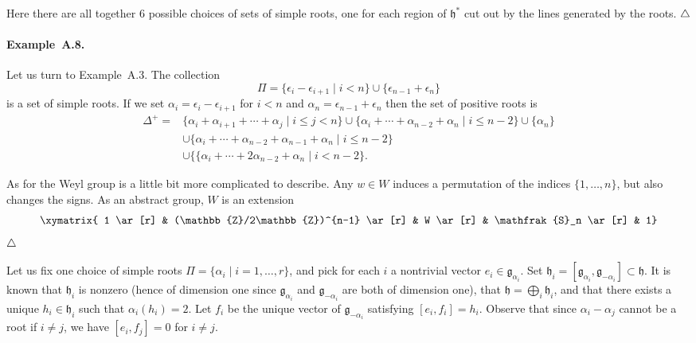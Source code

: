 \documentclass[a4paper,10pt]{amsart}
\def\Z{\mathbb{Z}}
\def\endexample{$\hfill \triangle$}
\def\a{\alpha}
\def\g{\mathfrak{g}}
\def\h{\mathfrak{h}}
\numberwithin{equation}{section}
\begin{document}
{\vspace{.9in}

\noindent Here there are all together $6$ possible choices of sets of simple roots, one for each region of $\h^*$ cut out by the lines generated by the roots.
\endexample

\vspace{.15in}

\addtocounter{theo}{1}

\paragraph{\textbf{Example~A.8.}} Let us turn to Example~A.3. The collection
$$\Pi=\{\epsilon_i-\epsilon_{i+1}\;|\; i <n\} \cup \{\epsilon_{n-1} + \epsilon_n\}$$
is a set of simple roots. If we set $\a_i=\epsilon_i-\epsilon_{i+1}$ for $i <n$ and $\alpha_n=\epsilon_{n-1} + \epsilon_n$ then the set of positive roots is
\begin{equation*}
\begin{split}
\Delta^+=& \{\a_i + \a_{i+1} + \cdots + \a_j\;|\; i\leq j<n\} \cup \{\a_i + \cdots + \a_{n-2} + \a_{n}\;|\; i \leq n-2 \} \cup \{\a_n\}\\
&\cup  \{\a_i + \cdots + \a_{n-2} + \a_{n-1} +\a_{n}\;|\; i \leq n-2 \} \\
&\cup \{ \{\a_i + \cdots + 2\a_{n-2} + \a_{n}\;|\; i < n-2 \}.
\end{split}
\end{equation*}

As for the Weyl group is a little bit more complicated to describe. Any $w \in W$ induces a permutation of the indices $\{1, \ldots, n\}$, but also changes the signs. As an abstract group, $W$ is an extension
$$\xymatrix{
1 \ar[r] & (\Z/2\Z)^{n-1} \ar[r] & W \ar[r] & \mathfrak{S}_n \ar[r] & 1}$$
\endexample

\vspace{.15in}

Let us fix one choice of simple roots $\Pi=\{\alpha_i\;|\; i=1, \ldots, r\}$, and pick for each $i$ a nontrivial vector $e_i \in \g_{\a_i}$. Set $\h_i=[\g_{\a_i},\g_{-\a_i}] \subset \h$. It is known that $\h_i$ is nonzero (hence of dimension one since $\g_{\a_i}$ and $\g_{-\a_i}$ are both of dimension one), that $\h=\bigoplus_i \h_i$, and that there exists a unique $h_i \in \h_i$ such that $\a_i(h_i)=2$. Let $f_i $ be the unique vector of $\g_{-\a_i}$ satisfying $[e_i,f_i]=h_i$. Observe that since $\a_i-\a_j$ cannot be a root if $i \neq j$, we have $[e_i,f_j]=0$ for $i \neq j$.

}
\end{document}
